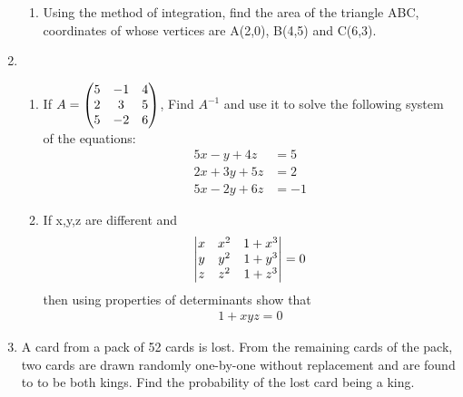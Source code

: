 \documentclass[journal,12pt,twocolumn]{IEEEtran}
\renewcommand\thesection{\arabic{section}}
\begin{document}
\begin{enumerate}[label=\thesection.\arabic*.,ref=\thesection.\theenumi]
\begin{enumerate}
\item Using the method of integration, find the area of the triangle ABC, coordinates of whose vertices are A(2,0), B(4,5) and C(6,3).\\
 \end{enumerate}
\item \begin{enumerate} \item If $A=\begin{pmatrix}5 & -1 & 4 \\ 2 & 3 & 5 \\ 5 & -2 & 6\end{pmatrix} $, Find $A^{-1}$ and use it to solve the following system of the equations: \\
\begin{align}
	5x-y+4z &= 5 \\
	2x+3y+5z &= 2\\
	5x-2y+6z &= -1 
\nonumber
\end{align}
    
\item If x,y,z are different and \begin{align} \begin{vmatrix}x & x^2 & 1+x^3 \\ y & y^2 & 1+y^3 \\ z & z^2 & 1+z^3\end{vmatrix}=0 \nonumber \end{align} then using properties of determinants show that \begin{align} 1+xyz=0 \nonumber \end{align}
\end{enumerate} 

\item A card from a pack of 52 cards is lost. From the remaining cards of the pack, two cards are drawn randomly one-by-one without replacement and are found to to be both kings. Find the probability of the lost card being a king.\\

\end{enumerate}
\end{document}
